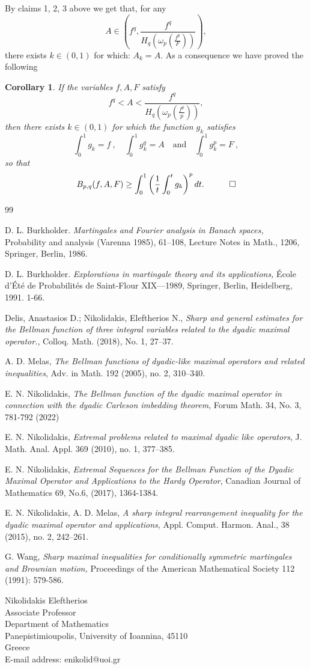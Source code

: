 \documentclass{article}
\numberwithin{equation}{section}
\newtheorem{corollary}{Corollary}[section]
\theoremstyle{definition}
\theoremstyle{remark}
\begin{document}
\noindent By claims 1, 2, 3 above we get that, for any $$ A \in \left ( f^q, \frac{f^q}{H_q \left ( \omega_p \left ( \frac{f^p}{F} \right ) \right )} \right ) ,$$
%
there exists $k \in (0,1)$ for which: $A_k = A$. As a consequence we have proved the following

\begin{corollary} 
  If the variables $f,A,F$ satisfy
    \[
        f^q < A < \frac{f^q}{ H_q \left ( \omega_p \left (\frac{f^p}{p} \right ) \right )} ,
    \]
    then there exists $k \in (0,1)$ for which the function $g_k$ satisfies
    \[
    \int_0^1 g_k = f \ , \quad \int_0^1 g_k^q = A \quad \text{and} \quad \int_0^1 g_k^p = F \ ,
    \]
    so that
    \[
    B_{p,q} (f,A,F) \geq \int_0^1 \left ( \frac{1}{t} \int_0^t g_k \right )^p dt . \quad \qed
    \]
\end{corollary}
%
%
%
%
%
\begin{thebibliography}{99}


    D. L. Burkholder.
    \emph{Martingales and Fourier analysis in Banach spaces,}
    Probability and analysis (Varenna 1985), 61--108, Lecture Notes in Math., 1206, Springer, Berlin, 1986.

    D. L. Burkholder.
    \emph{Explorations in martingale theory and its applications,}
    {\'E}cole d'{\'E}t{\'e} de Probabilit{\'e}s de Saint-Flour XIX—1989, Springer, Berlin, Heidelberg, 1991. 1-66. 	
	
	Delis, Anastasios D.; Nikolidakis, Eleftherios N.,
	\emph{Sharp and general estimates for the Bellman function of three integral variables related to the dyadic maximal operator.},
	Colloq. Math. (2018), No. 1,
	27--37.
		
	A. D. Melas,
	\emph{The Bellman functions of dyadic-like maximal operators and related inequalities},
	Adv. in Math. 192 (2005), no. 2,
	310--340.

	E. N. Nikolidakis,
	\emph{The Bellman function of the dyadic maximal operator in connection with the dyadic Carleson imbedding theorem},
	Forum Math. 34, No. 3, 781-792 (2022)	
		
	E. N. Nikolidakis,
	\emph{Extremal problems related to maximal dyadic like operators},
	J. Math. Anal. Appl. 369 (2010), no. 1,
	377--385.

	E. N. Nikolidakis,
	\emph{Extremal Sequences for the Bellman Function of the Dyadic Maximal Operator and Applications to the Hardy Operator},
	Canadian Journal of Mathematics 69, No.6, (2017), 1364-1384.
	
	E. N. Nikolidakis, A. D. Melas,
          \emph{A sharp integral rearrangement inequality for the dyadic maximal operator and applications},
	Appl. Comput. Harmon. Anal., 38 (2015), no. 2, 242--261.

      G. Wang,
      \emph{ Sharp maximal inequalities for conditionally symmetric martingales and Brownian motion,}
       Proceedings of the American Mathematical Society 112 (1991): 579-586.

	
\end{thebibliography}


\vspace{10pt}
\noindent Nikolidakis Eleftherios\\
Associate Professor\\
Department of Mathematics \\
Panepistimioupolis, University of Ioannina, 45110\\
Greece\\
E-mail address: enikolid@uoi.gr
\end{document}
